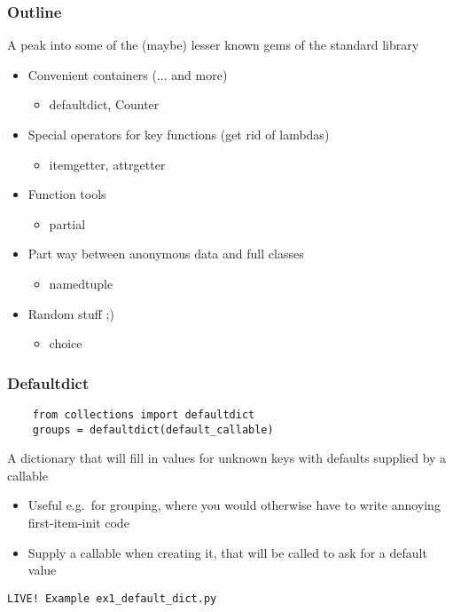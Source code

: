 \documentclass{beamer}
\begin{document}
\begin{frame}
  \frametitle{Outline}

  A peak into some of the (maybe) lesser known gems of the standard library
  \begin{itemize}
  \item Convenient containers (... and more)
    \begin{itemize}
    \item defaultdict, Counter
    \end{itemize}
  \item Special operators for key functions (get rid of lambdas)
    \begin{itemize}
    \item itemgetter, attrgetter
    \end{itemize}
  \item Function tools
    \begin{itemize}
    \item partial
    \end{itemize}
  \item Part way between anonymous data and full classes
    \begin{itemize}
    \item namedtuple
    \end{itemize}
  \item Random stuff ;)
    \begin{itemize}
    \item choice
    \end{itemize}
  \end{itemize}
\end{frame}

\begin{frame}[fragile]
  \frametitle{Defaultdict}
  \begin{verbatim}
    from collections import defaultdict
    groups = defaultdict(default_callable)
  \end{verbatim}
  \begin{block}{\vspace*{-3ex}}
    A dictionary that will fill in values for unknown keys with
    defaults supplied by a callable
  \end{block}
  \begin{itemize}
  \item Useful e.g.\ for grouping, where you would otherwise have to
    write annoying first-item-init code
  \item Supply a callable when creating it, that will be called to ask
    for a default value
  \end{itemize}
  \begin{center}
    \texttt{LIVE! Example ex1\_default\_dict.py}
  \end{center}
\end{frame}
\end{document}
